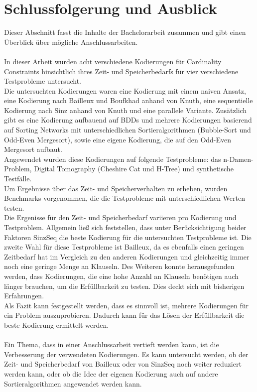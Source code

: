 \documentclass[a4,abstract=on]{scrartcl}
\newcommand*\stdsection{}
\let\stdsection\section
\renewcommand*\section{%
    \clearpage\ifodd\value{page}\else\mbox{}\clearpage\fi
    \stdsection}
\begin{document}
\section{Schlussfolgerung und Ausblick}
Dieser Abschnitt fasst die Inhalte der Bachelorarbeit zusammen und gibt einen Überblick über mögliche Anschlussarbeiten.\\
\ \\
In dieser Arbeit wurden acht verschiedene Kodierungen für Cardinality Constraints hinsichtlich ihres Zeit- und Speicherbedarfs für vier verschiedene Testprobleme untersucht.\\
Die untersuchten Kodierungen waren eine Kodierung mit einem naiven Ansatz, eine Kodierung nach Bailleux und Boufkhad anhand von Knuth, eine sequentielle Kodierung nach Sinz anhand von Knuth und eine parallele Variante. Zusätzlich gibt es eine Kodierung aufbauend auf BDDs und mehrere Kodierungen basierend auf Sorting Networks mit unterschiedlichen Sortieralgorithmen (Bubble-Sort und Odd-Even Mergesort), sowie eine eigene Kodierung, die auf den Odd-Even Mergesort aufbaut.\\
Angewendet wurden diese Kodierungen auf folgende Testprobleme: das n-Damen-Problem, Digital Tomography (Cheshire Cat und H-Tree) und synthetische Testfälle.\\
Um Ergebnisse über das Zeit- und Speicherverhalten zu erheben, wurden Benchmarks vorgenommen, die die Testprobleme mit unterschiedlichen Werten testen. \\
Die Ergenisse für den Zeit- und Speicherbedarf variieren pro Kodierung und Testproblem. Allgemein ließ sich feststellen, dass unter Berücksichtigung beider Faktoren SinzSeq die beste Kodierung für die untersuchten Testprobleme ist. Die zweite Wahl für diese Testprobleme ist Bailleux, da es ebenfalls einen geringen Zeitbedarf hat im Vergleich zu den anderen Kodierungen und gleichzeitig immer noch eine geringe Menge an Klauseln. Des Weiteren konnte herausgefunden werden, dass Kodierungen, die eine hohe Anzahl an Klauseln benötigen auch länger brauchen, um die Erfüllbarkeit zu testen. Dies deckt sich mit bisherigen Erfahrungen.\\
Als Fazit kann festgestellt werden, dass es sinnvoll ist, mehrere Kodierungen für ein Problem auszuprobieren. Dadurch kann für das Lösen der Erfüllbarkeit die beste Kodierung ermittelt werden.\\
\ \\
Ein Thema, dass in einer Anschlussarbeit vertieft werden kann, ist die Verbesserung der verwendeten Kodierungen. Es kann untersucht werden, ob der Zeit- und Speicherbedarf von Bailleux oder von SinzSeq noch weiter reduziert werden kann, oder ob die Idee der eigenen Kodierung auch auf andere Sortieralgorithmen angewendet werden kann.\\
\end{document}
